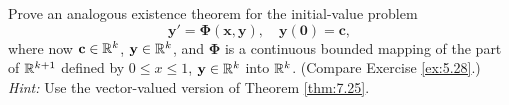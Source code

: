\begin{myexercise}
    \label{ex:7.26}
    Prove an analogous existence theorem for the initial-value problem
    \begin{equation*}
        \mathbf{y' = \Phi(x, y)}, \quad    \mathbf{y(0) = c},
    \end{equation*}
    where now $\mathbf{c} \in {\protect\mathbb R}^{k}$, $\mathbf{y} \in {\protect\mathbb R}^{k}$, and $\mathbf{\Phi}$ is a continuous bounded mapping of the part of ${\protect\mathbb R}^{k+1}$ defined by $0 \leq x \leq 1$, $\mathbf{y} \in {\protect\mathbb R}^k$ into ${\protect\mathbb R}^k$. 
    (Compare Exercise \ref{ex:5.28}.) 
    \emph{Hint:} Use the vector-valued version of Theorem \ref{thm:7.25}.
\end{myexercise}